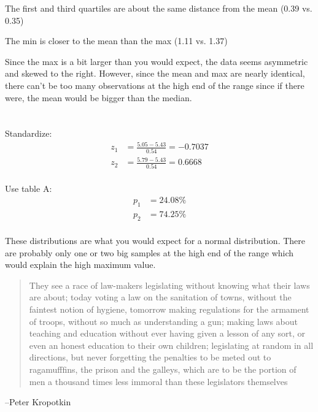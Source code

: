 \documentclass[letterpaper, landscape]{exam}
\begin{document}
\begin{description}
\begin{parts}
\begin{itemize*}
              \item The first and third quartiles are about the same distance from the
                mean (0.39 vs. 0.35)

              \item The min is closer to the mean than the max (1.11 vs. 1.37) 
            \end{itemize*}

            Since the max is a bit larger than you would expect, the data seems asymmetric
            and skewed to the right.  However, since the mean and max are nearly
            identical, there can't be too many observations at the high end of the range
            since if there were, the mean would be bigger than the median.

        \part{}
          Standardize:
          \begin{align*}
            z_1 & = \frac{5.05 - 5.43}{0.54} = -0.7037 \\
            z_2 & = \frac{5.79 - 5.43}{0.54} = 0.6668 \\
          \end{align*}

          Use table A:\@
          \begin{align*}
            p_1 & = 24.08 \% \\
            p_2 & = 74.25 \% \\
          \end{align*}

          These distributions are what you would expect for a
          normal distribution.  There are probably only one or two big samples
          at the high end of the range which would explain the high maximum
          value. 

        \end{parts}


    \end{description}

  \else
    \vspace{9 cm}
    \begin{quote}
      \begin{em}
        They see a race of law-makers legislating without knowing what their
        laws are about; today voting a law on the sanitation of towns, without
        the faintest notion of hygiene, tomorrow making regulations for the
        armament of troops, without so much as understanding a gun; making laws
        about teaching and education without ever having given a lesson of any
        sort, or even an honest education to their own children; legislating at
        random in all directions, but never forgetting the penalties to be meted
        out to ragamufffins, the prison and the galleys, which are to be the
        portion of men a thousand times less immoral than these legislators
        themselves
      \end{em}
    \end{quote}
    \hspace{1 cm} --Peter Kropotkin
  \fi
\end{document}

